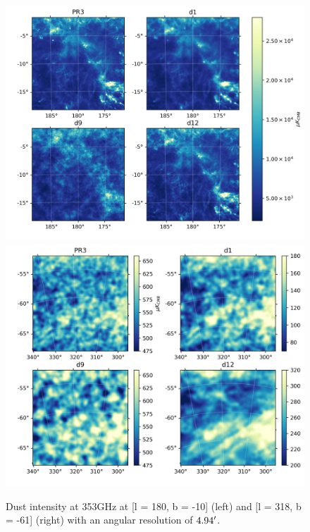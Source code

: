 \documentclass[twocolumn]{aastex631}
\begin{document}

\begin{figure}[t!]
    \centering
    \includegraphics[height=0.395\textwidth]{figures/I_gal_plane.png}
    \includegraphics[height=0.395\textwidth]{figures/I_BK.png}
\caption{Dust intensity at 353GHz at [l = 180, b = -10] (left) and [l = 318, b = -61] (right) with an angular resolution of $4.94\mbox{$^\prime$}$.}    
\label{fig:353_int}
\end{figure}
\end{document}
